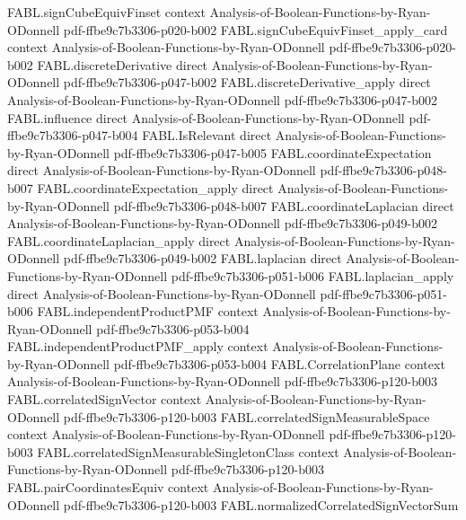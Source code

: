 \begin{theorem}
\proofstep
  {FABL.signCubeEquivFinset}
  {context}
  {Analysis-of-Boolean-Functions-by-Ryan-ODonnell}
  {pdf-ffbe9c7b3306-p020-b002}
\proofstep
  {FABL.signCubeEquivFinset_apply_card}
  {context}
  {Analysis-of-Boolean-Functions-by-Ryan-ODonnell}
  {pdf-ffbe9c7b3306-p020-b002}
\proofstep
  {FABL.discreteDerivative}
  {direct}
  {Analysis-of-Boolean-Functions-by-Ryan-ODonnell}
  {pdf-ffbe9c7b3306-p047-b002}
\proofstep
  {FABL.discreteDerivative_apply}
  {direct}
  {Analysis-of-Boolean-Functions-by-Ryan-ODonnell}
  {pdf-ffbe9c7b3306-p047-b002}
\proofstep
  {FABL.influence}
  {direct}
  {Analysis-of-Boolean-Functions-by-Ryan-ODonnell}
  {pdf-ffbe9c7b3306-p047-b004}
\proofstep
  {FABL.IsRelevant}
  {direct}
  {Analysis-of-Boolean-Functions-by-Ryan-ODonnell}
  {pdf-ffbe9c7b3306-p047-b005}
\proofstep
  {FABL.coordinateExpectation}
  {direct}
  {Analysis-of-Boolean-Functions-by-Ryan-ODonnell}
  {pdf-ffbe9c7b3306-p048-b007}
\proofstep
  {FABL.coordinateExpectation_apply}
  {direct}
  {Analysis-of-Boolean-Functions-by-Ryan-ODonnell}
  {pdf-ffbe9c7b3306-p048-b007}
\proofstep
  {FABL.coordinateLaplacian}
  {direct}
  {Analysis-of-Boolean-Functions-by-Ryan-ODonnell}
  {pdf-ffbe9c7b3306-p049-b002}
\proofstep
  {FABL.coordinateLaplacian_apply}
  {direct}
  {Analysis-of-Boolean-Functions-by-Ryan-ODonnell}
  {pdf-ffbe9c7b3306-p049-b002}
\proofstep
  {FABL.laplacian}
  {direct}
  {Analysis-of-Boolean-Functions-by-Ryan-ODonnell}
  {pdf-ffbe9c7b3306-p051-b006}
\proofstep
  {FABL.laplacian_apply}
  {direct}
  {Analysis-of-Boolean-Functions-by-Ryan-ODonnell}
  {pdf-ffbe9c7b3306-p051-b006}
\proofstep
  {FABL.independentProductPMF}
  {context}
  {Analysis-of-Boolean-Functions-by-Ryan-ODonnell}
  {pdf-ffbe9c7b3306-p053-b004}
\proofstep
  {FABL.independentProductPMF_apply}
  {context}
  {Analysis-of-Boolean-Functions-by-Ryan-ODonnell}
  {pdf-ffbe9c7b3306-p053-b004}
\proofstep
  {FABL.CorrelationPlane}
  {context}
  {Analysis-of-Boolean-Functions-by-Ryan-ODonnell}
  {pdf-ffbe9c7b3306-p120-b003}
\proofstep
  {FABL.correlatedSignVector}
  {context}
  {Analysis-of-Boolean-Functions-by-Ryan-ODonnell}
  {pdf-ffbe9c7b3306-p120-b003}
\proofstep
  {FABL.correlatedSignMeasurableSpace}
  {context}
  {Analysis-of-Boolean-Functions-by-Ryan-ODonnell}
  {pdf-ffbe9c7b3306-p120-b003}
\proofstep
  {FABL.correlatedSignMeasurableSingletonClass}
  {context}
  {Analysis-of-Boolean-Functions-by-Ryan-ODonnell}
  {pdf-ffbe9c7b3306-p120-b003}
\proofstep
  {FABL.pairCoordinatesEquiv}
  {context}
  {Analysis-of-Boolean-Functions-by-Ryan-ODonnell}
  {pdf-ffbe9c7b3306-p120-b003}
\proofstep
  {FABL.normalizedCorrelatedSignVectorSum}

\end{theorem}
